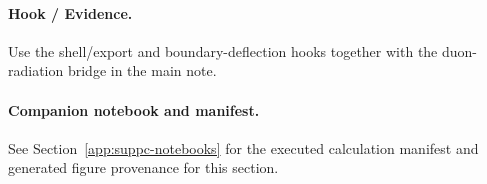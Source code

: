 \FloatBarrier

\paragraph{Hook / Evidence.} Use the shell/export and boundary-deflection hooks together with the duon-radiation bridge in the main note.

\paragraph{Companion notebook and manifest.} See Section~\ref{app:suppc-notebooks} for the executed calculation manifest and generated figure provenance for this section.

\begin{quote}\small{}\end{quote}

